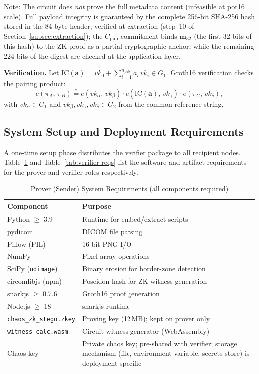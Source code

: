 \documentclass{jstarticle}
\begin{document}
\noindent
Note: The circuit does \emph{not} prove the full metadata content (infeasible at pot16 scale).
Full payload integrity is guaranteed by the complete 256-bit SHA-256 hash stored in the 84-byte header, verified at extraction (step~10 of Section~\ref{subsec:extraction}); the $C_{\text{pub}}$ commitment binds $\mathbf{m}_{32}$ (the first 32 bits of this hash) to the ZK proof as a partial cryptographic anchor, while the remaining 224 bits of the digest are checked at the application layer.

\textbf{Verification.}
Let $\mathrm{IC}(\mathbf{a}) = vk_0 + \sum_{i=1}^{n_{\text{pub}}} a_i\, vk_i \in G_1$.
Groth16 verification checks the pairing product:
\begin{equation}
e(\pi_A,\, \pi_B) \stackrel{?}{=}
e(vk_\alpha,\, vk_\beta) \cdot
e\!\left(\mathrm{IC}(\mathbf{a}),\, vk_\gamma\right) \cdot
e(\pi_C,\, vk_\delta),
\label{eq:groth16-pair}
\end{equation}
with $vk_\alpha \in G_1$ and $vk_\beta, vk_\gamma, vk_\delta \in G_2$ from the common reference string.

\subsection{System Setup and Deployment Requirements}

A one-time setup phase distributes the verifier package to all recipient nodes.
Table~\ref{tab:prover-reqs} and Table~\ref{tab:verifier-reqs} list the software and artifact requirements for the prover and verifier roles respectively.

\begin{table}[htbp]
\centering\small
\caption{Prover (Sender) System Requirements (all components required)}
\label{tab:prover-reqs}
\begin{tabularx}{\columnwidth}{@{}l X@{}}
\toprule
\textbf{Component} & \textbf{Purpose} \\
\midrule
Python $\geq$ 3.9      & Runtime for embed/extract scripts \\
pydicom                & DICOM file parsing \\
Pillow (PIL)           & 16-bit PNG I/O \\
NumPy                  & Pixel array operations \\
SciPy (\texttt{ndimage})& Binary erosion for border-zone detection \\
circomlibjs (npm)      & Poseidon hash for ZK witness generation \\
snarkjs $\geq$ 0.7.6   & Groth16 proof generation \\
Node.js $\geq$ 18      & snarkjs runtime \\
\texttt{chaos\_zk\_stego.zkey} & Proving key (12\,MB); kept on prover only \\
\texttt{witness\_calc.wasm}    & Circuit witness generator (WebAssembly) \\
Chaos key                      & Private chaos key; pre-shared with verifier; storage mechanism (file, environment variable, secrets store) is deployment-specific \\
\bottomrule
\end{tabularx}
\end{table}
\end{document}
